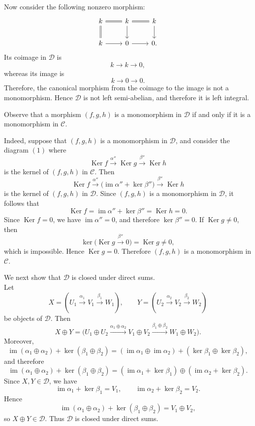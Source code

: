 \documentclass[a4paper,10pt,reqno]{amsart}
\newcommand{\Ker}{\operatorname{Ker}\nolimits}
\newcommand{\im}{\operatorname{im}\nolimits}
\begin{document}
	Now consider the following nonzero morphism:
	$$
	\begin{tikzcd}
		k \arrow[r, equal] \arrow[d, equal] & k \arrow[r, equal] \arrow[d] & k \arrow[d] \\
		k \arrow[r]                         & 0 \arrow[r]                  & 0.
	\end{tikzcd}
	$$
	Its coimage in $\mathcal{D}$ is
	$$k \to k \to 0,$$
	whereas its image is
	$$k \to 0 \to 0.$$
	Therefore, the canonical morphism from the coimage to the image is not a monomorphism. Hence $\mathcal{D}$ is not left semi-abelian, and therefore it is left integral.
	\par Observe that a morphism $(f,g,h)$ is a monomorphism in $\mathcal{D}$ if and only if it is a monomorphism in $\mathcal{C}$.
	
	Indeed, suppose that $(f,g,h)$ is a monomorphism in $\mathcal{D}$, and consider the diagram $(1)$ where
	$$
	\Ker f \xrightarrow{\alpha''} \Ker g \xrightarrow{\beta''} \Ker h
	$$
	is the kernel of $(f,g,h)$ in $\mathcal{C}$. Then
	$$
	\Ker f \xrightarrow{\alpha''} \bigl(\im \alpha''+\ker \beta''\bigr) \xrightarrow{\beta''} \Ker h
	$$
	is the kernel of $(f,g,h)$ in $\mathcal{D}$. Since $(f,g,h)$ is a monomorphism in $\mathcal{D}$, it follows that
	$$
	\Ker f=\im \alpha''+\ker \beta''=\Ker h=0.
	$$
	Since $\Ker f=0$, we have $\im \alpha''=0$, and therefore $\ker \beta''=0$. If $\Ker g\neq 0$, then
	$$
	\ker\bigl(\Ker g \xrightarrow{\beta''} 0\bigr)=\Ker g\neq 0,
	$$
	which is impossible. Hence $\Ker g=0$. Therefore $(f,g,h)$ is a monomorphism in $\mathcal{C}$. 
	\par We next show that $\mathcal{D}$ is closed under direct sums.\\
	Let
	$$
	X=(U_1 \xrightarrow{\alpha_1} V_1 \xrightarrow{\beta_1} W_1),
	\qquad
	Y=(U_2 \xrightarrow{\alpha_2} V_2 \xrightarrow{\beta_2} W_2)
	$$
	be objects of $\mathcal{D}$. Then
	$$
	X\oplus Y=
	\bigl(
	U_1\oplus U_2 \xrightarrow{\alpha_1\oplus \alpha_2}
	V_1\oplus V_2 \xrightarrow{\beta_1\oplus \beta_2}
	W_1\oplus W_2
	\bigr).
	$$
	Moreover,
	$$
	\im(\alpha_1\oplus \alpha_2)+\ker(\beta_1\oplus \beta_2)
	=
	(\im \alpha_1\oplus \im \alpha_2)+(\ker \beta_1\oplus \ker \beta_2),
	$$
	and therefore
	$$
	\im(\alpha_1\oplus \alpha_2)+\ker(\beta_1\oplus \beta_2)
	=
	(\im \alpha_1+\ker \beta_1)\oplus (\im \alpha_2+\ker \beta_2).
	$$
	Since $X,Y\in\mathcal D$, we have
	$$
	\im \alpha_1+\ker \beta_1=V_1,
	\qquad
	\im \alpha_2+\ker \beta_2=V_2.
	$$
	Hence
	$$
	\im(\alpha_1\oplus \alpha_2)+\ker(\beta_1\oplus \beta_2)=V_1\oplus V_2,
	$$
	so $X\oplus Y\in\mathcal D$. Thus $\mathcal D$ is closed under direct sums.
	
\end{document}
